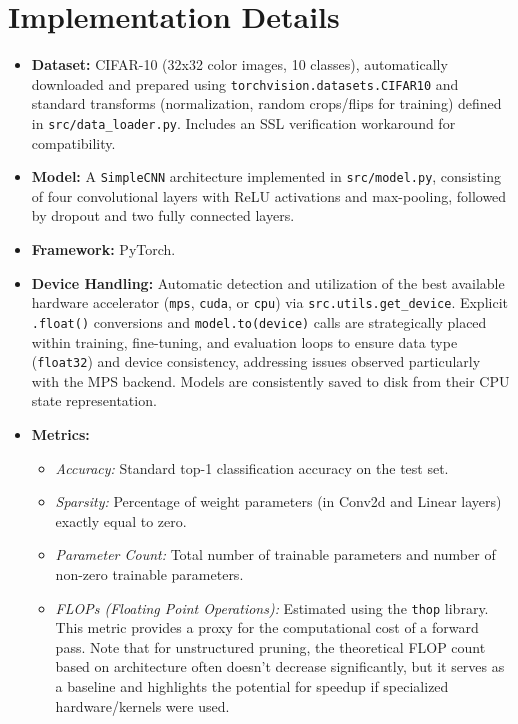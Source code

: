 \documentclass[10pt, article]{article} %
\begin{document}
\section{Implementation Details}
\begin{itemize}
    \item \textbf{Dataset:} CIFAR-10 (32x32 color images, 10 classes), automatically downloaded and prepared using \texttt{torchvision.datasets.CIFAR10} and standard transforms (normalization, random crops/flips for training) defined in \texttt{src/data\_loader.py}. Includes an SSL verification workaround for compatibility.
    \item \textbf{Model:} A \texttt{SimpleCNN} architecture implemented in \texttt{src/model.py}, consisting of four convolutional layers with ReLU activations and max-pooling, followed by dropout and two fully connected layers.
    \item \textbf{Framework:} PyTorch.
    \item \textbf{Device Handling:} Automatic detection and utilization of the best available hardware accelerator (\texttt{mps}, \texttt{cuda}, or \texttt{cpu}) via \texttt{src.utils.get\_device}. Explicit \texttt{.float()} conversions and \texttt{model.to(device)} calls are strategically placed within training, fine-tuning, and evaluation loops to ensure data type (\texttt{float32}) and device consistency, addressing issues observed particularly with the MPS backend. Models are consistently saved to disk from their CPU state representation.
    \item \textbf{Metrics:}
        \begin{itemize}
            \item \textit{Accuracy:} Standard top-1 classification accuracy on the test set.
            \item \textit{Sparsity:} Percentage of weight parameters (in Conv2d and Linear layers) exactly equal to zero.
            \item \textit{Parameter Count:} Total number of trainable parameters and number of non-zero trainable parameters.
            \item \textit{FLOPs (Floating Point Operations):} Estimated using the \texttt{thop} library. This metric provides a proxy for the computational cost of a forward pass. Note that for unstructured pruning, the theoretical FLOP count based on architecture often doesn't decrease significantly, but it serves as a baseline and highlights the potential for speedup if specialized hardware/kernels were used.

\end{itemize}
\end{itemize}
\end{document}
